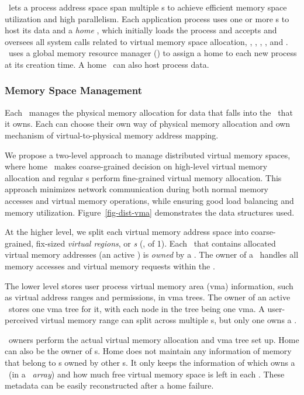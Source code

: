\documentclass[10pt,times,twocolumn]{z2-article}
\begin{document}
{{{{{{{\lego\ lets a process address space span multiple \mcomponent{}s
to achieve efficient memory space utilization and high parallelism.
Each application process uses one or more \mcomponent{}s to host its data
and a {\em home \mcomponent},
which initially loads the process
and accepts and oversees all system calls related to virtual memory space allocation, 
\eg, \brk, \mmap, \munmap, and \mremap.
\lego\ uses a global memory resource manager ({\em \gmm}) to assign a home \mcomponent{} to each new process at its creation time.
A home \mcomponent\ can also host process data.


\subsubsection{Memory Space Management}
Each \mcomponent\ manages the physical memory allocation for data that falls into the
\vregion\ that it owns.
Each \mcomponent{} can choose their own way of physical memory allocation
and own mechanism of virtual-to-physical memory address mapping.

We propose a two-level approach to manage distributed virtual memory spaces,
where home \mcomponent\ makes coarse-grained decision on high-level virtual memory allocation
and regular \mcomponent{}s perform fine-grained virtual memory allocation.
This approach minimizes network communication during both normal memory accesses and virtual memory operations,
while ensuring good load balancing and memory utilization.
Figure~\ref{fig-dist-vma} demonstrates the data structures used. %

At the higher level, we split each virtual memory address space into coarse-grained, fix-sized {\em virtual regions},
or {\em \vregion{}s} (\eg, of 1\GB).
Each \vregion\ that contains allocated virtual memory addresses (an active \vregion) is {\em owned} by a \mcomponent{}.
The owner of a \vregion\ handles all memory accesses and virtual memory requests within the \vregion.

The lower level stores user process virtual memory area (vma) information,
such as virtual address ranges and permissions, in vma trees.
The owner of an active \vregion\ stores one vma tree for it,
with each node in the tree being one vma.
A user-perceived virtual memory range can split across multiple \mcomponent{}s,
but only one \mcomponent{} owns a \vregion.

\vregion\ owners perform the actual virtual memory allocation and vma tree set up.
Home \mcomponent{} can also be the owner of \vregion{}s.
Home \mcomponent{} does not maintain any information of memory that belong to \vregion{}s owned by other \mcomponent{}s.
It only keeps the information of which \mcomponent{} owns a \vregion\ (in a {\em \vregion\ array})
and how much free virtual memory space is left in each \vregion.
These metadata can be easily reconstructed after a home \mcomponent{} failure.

}}}}}}}
\end{document}
